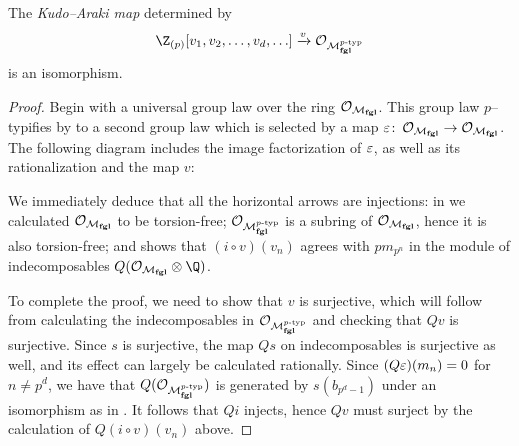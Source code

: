 \begin{theorem}\label{KudoArakiIsomorphism}
The \textit{Kudo--Araki map} determined by  \[\Z_{(p)}[v_1, v_2, \ldots, v_d, \ldots] \xrightarrow{v} \sheaf O_{\moduli{fgl}^{\ptyp}}\] is an isomorphism.
\end{theorem}
\begin{proof}
Begin with a universal group law over the ring $\mathcal{O}_{\mathcal{M}_{\mathbf{fgl}}}$.  This group law $p$--typifies by  to a second group law which is selected by a map $\varepsilon\colon\thinspace \mathcal{O}_{\mathcal{M}_{\mathbf{fgl}}} \to \mathcal{O}_{\mathcal{M}_{\mathbf{fgl}}}$.  The following diagram includes the image factorization of $\varepsilon$, as well as its rationalization and the map $v$:
\begin{center}
\end{center}
We immediately deduce that all the horizontal arrows are injections: in  we calculated $\mathcal{O}_{\mathcal{M}_{\mathbf{fgl}}}$ to be torsion-free; $\mathcal{O}_{\mathcal{M}_{\mathbf{fgl}}^{p\text{-}\mathrm{typ}}}$ is a subring of $\mathcal{O}_{\mathcal{M}_{\mathbf{fgl}}}$, hence it is also torsion-free; and  shows that $(i \circ v)(v_n)$ agrees with $pm_{p^n}$ in the module of indecomposables $Q(\sheaf O_{\moduli{fgl}} \otimes \Q)$.

To complete the proof, we need to show that $v$ is surjective, which will follow from calculating the indecomposables in $\mathcal{O}_{\mathcal{M}_{\mathbf{fgl}}^{p\text{-}\mathrm{typ}}}$ and checking that $Qv$ is surjective.  Since $s$ is surjective, the map $Qs$ on indecomposables is surjective as well, and its effect can largely be calculated rationally.  Since $(Q\varepsilon)(m_n) = 0$ for $n \ne p^d$, we have that $Q(\mathcal{O}_{\mathcal{M}_{\mathbf{fgl}}^{p\text{-}\mathrm{typ}}})$ is generated by $s(b_{p^d-1})$ under an isomorphism as in .  It follows that $Qi$ injects, hence $Qv$ must surject by the calculation of $Q(i \circ v)(v_n)$ above.
\end{proof}

